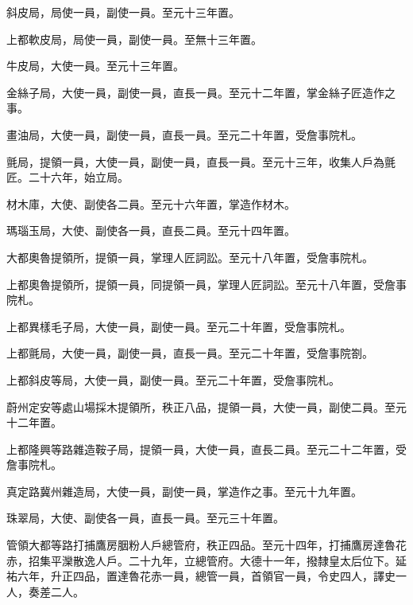 \begin{pinyinscope}
 斜皮局，局使一員，副使一員。至元十三年置。



 上都軟皮局，局使一員，副使一員。至無十三年置。



 牛皮局，大使一員。至元十三年置。



 金絲子局，大使一員，副使一員，直長一員。至元十二年置，掌金絲子匠造作之事。



 畫油局，大使一員，副使一員，直長一員。至元二十年置，受詹事院札。



 氈局，提領一員，大使一員，副使一員，直長一員。至元十三年，收集人戶為氈匠。二十六年，始立局。



 材木庫，大使、副使各二員。至元十六年置，掌造作材木。



 瑪瑙玉局，大使、副使各一員，直長二員。至元十四年置。



 大都奧魯提領所，提領一員，掌理人匠詞訟。至元十八年置，受詹事院札。



 上都奧魯提領所，提領一員，同提領一員，掌理人匠詞訟。至元十八年置，受詹事院札。



 上都異樣毛子局，大使一員，副使一員。至元二十年置，受詹事院札。



 上都氈局，大使一員，副使一員，直長一員。至元二十年置，受詹事院劄。



 上都斜皮等局，大使一員，副使一員。至元二十年置，受詹事院札。



 蔚州定安等處山場採木提領所，秩正八品，提領一員，大使一員，副使二員。至元十二年置。



 上都隆興等路雜造鞍子局，提領一員，大使一員，直長二員。至元二十二年置，受詹事院札。



 真定路冀州雜造局，大使一員，副使一員，掌造作之事。至元十九年置。



 珠翠局，大使、副使各一員，直長一員。至元三十年置。



 管領大都等路打捕鷹房胭粉人戶總管府，秩正四品。至元十四年，打捕鷹房達魯花赤，招集平灤散逸人戶。二十九年，立總管府。大德十一年，撥隸皇太后位下。延祐六年，升正四品，置達魯花赤一員，總管一員，首領官一員，令史四人，譯史一人，奏差二人。




\end{pinyinscope}
